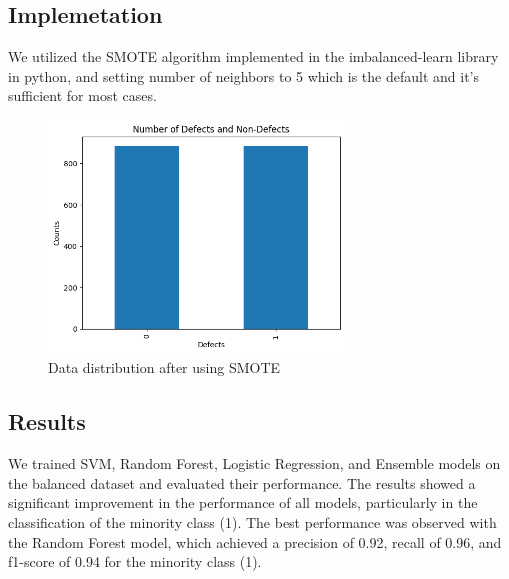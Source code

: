 \documentclass[12pt]{report}
\begin{document}
\subsection*{Implemetation}
We utilized the SMOTE algorithm implemented in the imbalanced-learn library in
python, and setting number of neighbors to 5 which is the default and it's
sufficient for most cases.

\begin{figure}[ht]
    \centering
    \includegraphics[width=0.7\textwidth]{./figures/balanced_data.png}
    \caption{Data distribution after using SMOTE}
    \label{fig:smote_plot}
\end{figure}

\subsection*{Results}
We trained SVM, Random Forest, Logistic Regression, and Ensemble models on the
balanced dataset and evaluated their performance. The results showed a
significant improvement in the performance of all models, particularly in the
classification of the minority class (1). The best performance was observed
with the Random Forest model, which achieved a precision of 0.92, recall of
0.96, and f1-score of 0.94 for the minority class (1).
\end{document}
